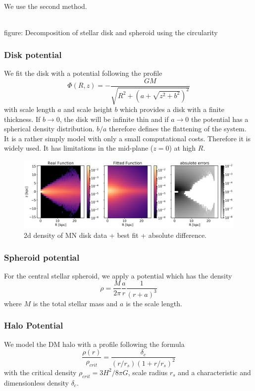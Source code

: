 We use the second method. 


\\figure: Decomposition of stellar disk and spheroid using the circularity

\subsubsection{Disk potential}
We fit the disk with a \citet{MNprofile} potential following the profile 
\begin{equation}
\Phi(R,z) = -\frac{GM}{\sqrt{R^2+(a+\sqrt{z^2+b^2})^2}}
\end{equation} 
with scale length $a$ and scale height $b$ which provides a disk with a finite thickness. If $b\rightarrow 0$, the disk will be infinite thin and if $a \rightarrow 0$ the potential has a spherical density distribution. $b/a$ therefore defines the flattening of the system. It is a rather simply model with only a small computational costs. Therefore it is widely used. It has limitations in the mid-plane ($z=0$) at high $R$. 

\begin{figure}
    \centering
    \includegraphics[width = \textwidth]{plots/Auriga/MND_best_fit.png}
    \caption{2d density of MN disk data + best fit + absolute difference.}
    \label{fig:MND}
\end{figure}

\subsubsection{Spheroid potential}\label{subsec:spher_pot}
For the central stellar spheroid, we apply a \citet{Hernquistprofile} potential which has the density 
\begin{equation}
    \rho = \frac{M}{2\pi}\frac{a}{r}\frac{1}{(r+a)^3}
\end{equation}
where $M$ is the total stellar mass and $a$ is the scale length. 





\subsubsection{Halo Potential}
We model the \ac{DM} halo with a \citet{NFWprofile} profile following the formula 
\begin{equation}
    \frac{\rho(r)}{\rho_{crit}} = \frac{\delta_c}{(r/r_s)(1+r/r_s)^2}
\end{equation} with the critical density $\rho_{crit} = 3H^2 / 8\pi G $, scale radius $r_s$  and a characteristic and dimensionless density $\delta_c$. 






